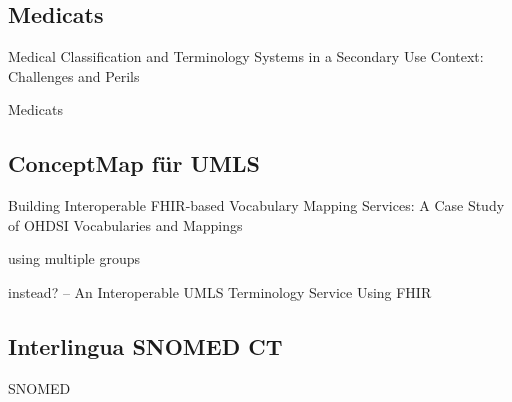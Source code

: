 \subsection{Medicats}

Medical Classification and Terminology Systems in a Secondary Use Context: Challenges and Perils \cite{hund}

Medicats \cite{medicats}

\subsection{ConceptMap für UMLS}

Building Interoperable FHIR-based Vocabulary Mapping Services:
A Case Study of OHDSI Vocabularies and Mappings

using multiple groups \cite{saripalle2019representing}

instead? -- An Interoperable UMLS Terminology Service Using FHIR 

\begin{comment}

--------------

UMLS

\bibitem{UMLS FHIR}
``An Interoperable UMLS Terminology Service Using FHIR'' \newline
\url{https://www.mdpi.com/1999-5903/12/11/199}

\bibitem{UMLS FHIR 2}
``Representing UMLS knowledge using FHIR Terminological Resources'' \newline
\url{https://ieeexplore.ieee.org/abstract/document/8983305}

--------------


\bibitem{MENDS-on-FHIR}
``MENDS-on-FHIR: Leveraging the OMOP common data model and FHIR standards for national chronic disease surveillance'' \newline
\url{https://www.medrxiv.org/content/10.1101/2023.08.09.23293900v2}


\end{comment}

\subsection{Interlingua SNOMED CT}

SNOMED \cite{icd10-to-snomed}


